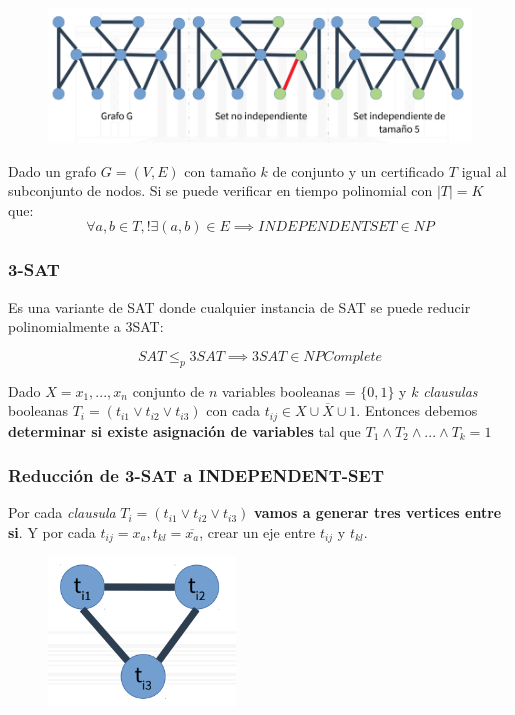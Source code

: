 \documentclass{article}
\begin{document}
\begin{figure}[h!]
    \includegraphics[width=\linewidth]{imagenes/conjunto-independiente.png}
\end{figure}

Dado un grafo \(G=(V,E)\) con tamaño \(k\) de conjunto y un certificado \(T\) igual 
al subconjunto de nodos. Si se puede verificar en tiempo polinomial con \(|T| = K\) que:
\[
    \forall a,b \in T, !\exists (a,b) \in E \implies INDEPENDENTSET \in NP    
\]

\subsubsection{3-SAT}
Es una variante de SAT donde cualquier instancia de SAT se puede reducir polinomialmente a 3SAT:

\[
    SAT \leq_p 3SAT \implies 3SAT \in NPComplete
\]

Dado \(X={x_1,...,x_n}\) conjunto de \(n\) variables booleanas = \(\{0,1\}\) y 
\(k\) \textit{clausulas} booleanas \(T_i=(t_{i1} \lor t_{i2} \lor t_{i3} )\) 
con cada \(t_{ij} \in X \cup \overline{X} \cup {1}\). Entonces debemos 
\textbf{determinar si existe asignación de variables} tal que \(T_1 \land T_2 \land ... \land T_k = 1\)

\subsubsection{Reducción de 3-SAT a INDEPENDENT-SET}
Por cada \textit{clausula} \(T_i=(t_{i1} \lor t_{i2} \lor t_{i3} )\) \textbf{vamos a generar tres vertices entre si}.
Y por cada \(t_{ij}=x_a,t_{kl}=\overline{x_a} \), crear un eje entre \(t_{ij}\) y \(t_{kl}\).

\begin{figure}[h!]
    \includegraphics[scale=0.4]{imagenes/reduccion-3sat.png}
\end{figure}
\end{document}
